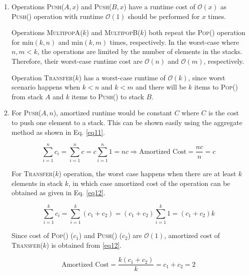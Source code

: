 \begin{enumerate}[label=(\alph*)]
\item Operations \textsc{Push}($A,x$) and \textsc{Push}($B,x$) have a runtime cost of $\mathcal{O}(x)$ as \textsc{Push}() operation with runtime $\mathcal{O}(1)$ should be performed for $x$ times.

Operations \textsc{MultipopA}($k$) and \textsc{MultipopB}($k$) both repeat the \textsc{Pop()} operation for $\text{min}(k,n)$ and $\text{min}(k,m)$ times, respectively.
In the worst-case where $n,m < k$, the operations are limited by the number of elements in the stacks.
Therefore, their worst-case runtime cost are $\mathcal{O}(n)$ and $\mathcal{O}(m)$, respectively.

Operation \textsc{Transfer($k$)} has a worst-case runtime of $\mathcal{O}(k)$, since worst scenario happens when $k < n$ and $k < m$ and there will be $k$ items to \textsc{Pop()} from stack $A$ and $k$ items to \textsc{Push()} to stack $B$.

\item For \textsc{Push}($A,n$), amortized runtime would be constant $C$ where $C$ is the cost to push one element to a stack.
This can be shown easily using the aggregate method as shown in Eq. \ref{eq11}.

\begin{equation}
\sum_{i=1}^{n} c_i = \sum_{i=1}^{n} c = c \sum_{i=1}^{n} 1 = nc \Rightarrow \text{Amortized Cost} = \frac{nc}{n} = c
\label{eq11}
\end{equation}

For \textsc{Transfer($k$)} operation, the worst case happens when there are at least $k$ elements in stack $k$, in which case amortized cost of the operation can be obtained as given in Eq. \ref{eq12}.

\begin{equation}
\sum_{i=1}^{k} c_i = \sum_{i=1}^{k}(c_1 + c_2) = (c_1 + c_2) \sum_{i=1}^{k} 1 = (c_1 + c_2) k
\label{eq12}
\end{equation}

Since cost of \textsc{Pop()} ($c_1$) and \textsc{Push()} ($c_2$) are $\mathcal{O}(1)$, amortized cost of \textsc{Transfer($k$)} is obtained from \ref{eq12}.

\begin{equation}
\text{Amortized Cost} = \frac{k(c_1 + c_2)}{k} = c_1 + c_2 = 2
\end{equation}

\end{enumerate}
